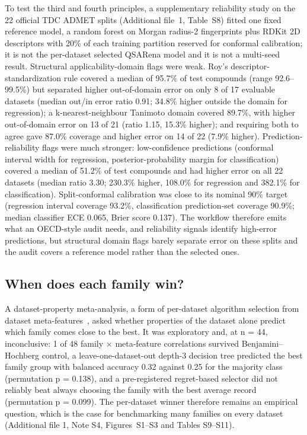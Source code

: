 To test the third and fourth principles, a supplementary reliability study on the 22 official TDC ADMET splits (Additional file~1, Table~S8) fitted one fixed reference model, a random forest on Morgan radius-2 fingerprints plus RDKit 2D descriptors with 20\% of each training partition reserved for conformal calibration; it is not the per-dataset selected QSARena model and it is not a multi-seed result. Structural applicability-domain flags were weak. Roy's descriptor-standardization rule \cite{roy2015applicability} covered a median of 95.7\% of test compounds (range 92.6--99.5\%) but separated higher out-of-domain error on only 8 of 17 evaluable datasets (median out/in error ratio 0.91; 34.8\% higher outside the domain for regression); a k-nearest-neighbour Tanimoto domain covered 89.7\%, with higher out-of-domain error on 13 of 21 (ratio 1.15, 15.3\% higher); and requiring both to agree gave 87.0\% coverage and higher error on 14 of 22 (7.9\% higher). Prediction-reliability flags were much stronger: low-confidence predictions (conformal interval width for regression, posterior-probability margin for classification) covered a median of 51.2\% of test compounds and had higher error on all 22 datasets (median ratio 3.30; 230.3\% higher, 108.0\% for regression and 382.1\% for classification). Split-conformal calibration was close to its nominal 90\% target (regression interval coverage 93.2\%, classification prediction-set coverage 90.9\%; median classifier ECE 0.065, Brier score 0.137). The workflow therefore emits what an OECD-style audit needs, and reliability signals identify high-error predictions, but structural domain flags barely separate error on these splits and the audit covers a reference model rather than the selected ones.

\subsection{When does each family win?}\label{sec:meta}

A dataset-property meta-analysis, a form of per-dataset algorithm selection from dataset meta-features~\cite{olier2018metaqsar}, asked whether properties of the dataset alone predict which family comes close to the best. It was exploratory and, at n = 44, inconclusive: 1 of 48 family $\times$ meta-feature correlations survived Benjamini--Hochberg control, a leave-one-dataset-out depth-3 decision tree predicted the best family group with balanced accuracy 0.32 against 0.25 for the majority class (permutation p = 0.138), and a pre-registered regret-based selector did not reliably beat always choosing the family with the best average record (permutation p = 0.099). The per-dataset winner therefore remains an empirical question, which is the case for benchmarking many families on every dataset (Additional file 1, Note S4, Figures~S1--S3 and Tables S9--S11).

